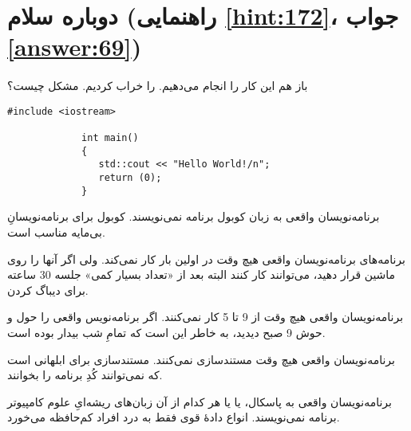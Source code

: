 \section[دوباره سلام]{دوباره سلام \protect{} (راهنمایی \ref{hint:172}، جواب \ref{answer:69})}
\paragraph{}\label{prog:17}
باز هم این کار را انجام می‌دهیم.  را خراب کردیم. مشکل چیست؟

\begin{LTR}
        \begin{lstlisting}[style=C++Style]
             #include <iostream>

             int main()
             {
             	std::cout << "Hello World!/n";
             	return (0);
             }
        \end{lstlisting}
\end{LTR}

\begin{tcolorbox}
    برنامه‌نویسان واقعی به زبان کوبول برنامه نمی‌نویسند. کوبول برای برنامه‌نویسانِ بی‌مایه مناسب است.

    برنامه‌های برنامه‌نویسان واقعی هیچ وقت در اولین بار کار نمی‌کند. ولی اگر آنها را روی ماشین قرار دهید، می‌توانند کار کنند البته بعد از «تعداد بسیار کمی» جلسه 30 ساعته برای دیباگ کردن.

    برنامه‌نویسان واقعی هیچ وقت از 9 تا 5 کار نمی‌کنند. اگر برنامه‌نویس واقعی را حول و حوش 9 صبح دیدید، به خاطر این است که تمامِ شب بیدار بوده است.

    برنامه‌نویسان واقعی هیچ وقت مستندسازی نمی‌کنند. مستندسازی برای ابلهانی است که نمی‌توانند کُدِ برنامه را بخوانند.

    برنامه‌نویسان واقعی به پاسکال،  یا  یا هر کدام از آن زبان‌های ریشه‌ایِ علوم کامپیوتر برنامه نمی‌نویسند. انواع دادهٔ قوی فقط به درد افراد کم‌حافظه می‌خورد.
\end{tcolorbox}